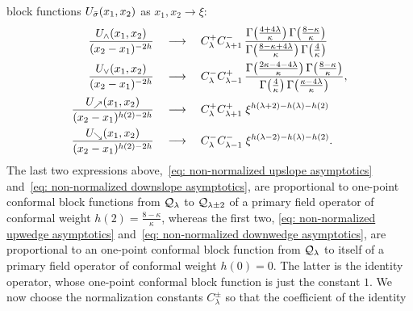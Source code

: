 \documentclass[oneside,english]{amsart}
\numberwithin{equation}{section}
\numberwithin{figure}{section}
\theoremstyle{plain}
\theoremstyle{plain}
\theoremstyle{plain}
\theoremstyle{remark}
\theoremstyle{plain}
\theoremstyle{plain}
\theoremstyle{plain}
\theoremstyle{plain}
\theoremstyle{plain}
\theoremstyle{plain}
\theoremstyle{plain}
\theoremstyle{plain}
\newcommand{\blue}[1]{{\color{blue} #1}}
\begin{document}
block functions $U_{\bar{\sigma}}(x_{1},x_{2})$ as %
$x_{1},x_{2} \to \xi$:
\begin{align}
\frac{U_{\wedge}(x_{1},x_{2})}{(x_{2}-x_{1})^{-2h}}\quad \longrightarrow \quad\; & C_{\lambda}^{+}C_{\lambda+1}^{-}\,\frac{\Gamma\big(\frac{4+4\lambda}{\kappa}\big)\,\Gamma\big(\frac{8-\kappa}{\kappa}\big)}{\Gamma\big(\frac{8-\kappa+4\lambda}{\kappa}\big)\,\Gamma\big(\frac{4}{\kappa}\big)}\label{eq: non-normalized upwedge asymptotics}\\
\frac{U_{\vee}(x_{1},x_{2})}{(x_{2}-x_{1})^{-2h}}\quad \longrightarrow \quad\; & C_{\lambda}^{-}C_{\lambda-1}^{+}\,\frac{\Gamma\big(\frac{2\kappa-4-4\lambda}{\kappa}\big)\,\Gamma\big(\frac{8-\kappa}{\kappa}\big)}{\Gamma\big(\frac{4}{\kappa}\big)\,\Gamma\big(\frac{\kappa-4\lambda}{\kappa}\big)},\label{eq: non-normalized downwedge asymptotics}\\
\frac{U_{\nearrow}(x_{1},x_{2})}{(x_{2}-x_{1})^{h(2)-2h}}\quad \longrightarrow \quad\; & C_{\lambda}^{+}C_{\lambda+1}^{+} \; 
\xi^{h(\lambda+2)-h(\lambda)-h(2)}\label{eq: non-normalized upslope asymptotics}\\
\frac{U_{\searrow}(x_{1},x_{2})}{(x_{2}-x_{1})^{h(2)-2h}}\quad \longrightarrow \quad\; & C_{\lambda}^{-}C_{\lambda-1}^{-} \; 
\xi^{h(\lambda-2)-h(\lambda)-h(2)}.\label{eq: non-normalized downslope asymptotics}
\end{align}
The last two expressions above,~\eqref{eq: non-normalized upslope asymptotics} and~\eqref{eq: non-normalized downslope asymptotics},
are proportional to one-point conformal block functions from $\mathcal{Q}_{\lambda}$
to $\mathcal{Q}_{\lambda\pm2}$ %
of a primary field operator of conformal
weight $h(2)=\frac{8-\kappa}{\kappa}$, whereas the first two,
\eqref{eq: non-normalized upwedge asymptotics} and~\eqref{eq: non-normalized downwedge asymptotics}, are
proportional to an one-point conformal block function from $\mathcal{Q}_{\lambda}$ to itself %
of
a primary field operator of conformal weight $h(0)=0$. %
The latter is
the identity operator, whose one-point conformal block function is just the constant $1$.
We now choose the
normalization constants $C_{\lambda}^{\pm}$ so that the coefficient of the identity
\end{document}
